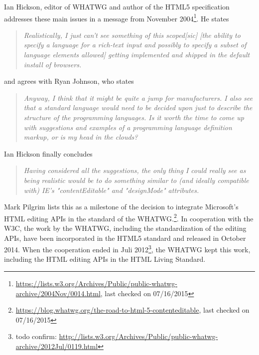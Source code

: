 
Ian Hickson, editor of WHATWG and author of the HTML5 specification addresses these main issues in a message from November 2004\footnote{\url{https://lists.w3.org/Archives/Public/public-whatwg-archive/2004Nov/0014.html}, last checked on 07/16/2015}. He states

\begin{quotation}
\textit{Realistically, I just can't see something of this scoped[sic] [the ability to specify a language for a rich-text input and possibly to specify a subset of language elements allowed] getting implemented and shipped in the default install of browsers.}
\end{quotation}

and agrees with Ryan Johnson, who states

\begin{quotation}
\textit{Anyway, I think that it might be quite a jump for manufacturers. I also see that a standard language would need to be decided upon just to describe the structure of the programming languages. Is it worth the time to come up with suggestions and examples of a programming language definition markup, or is my head in the clouds?}
\end{quotation}

Ian Hickson finally concludes

\begin{quotation}
\textit{Having considered all the suggestions, the only thing I could really see 
as being realistic would be to do something similar to (and ideally 
compatible with) IE's "contentEditable" and "designMode" attributes.}
\end{quotation}

Mark Pilgrim lists this as a milestone of the decision to integrate Microsoft's HTML editing APIs in the standard of the WHATWG.\footnote{\url{https://blog.whatwg.org/the-road-to-html-5-contenteditable}, last checked on 07/16/2015}. In cooperation with the W3C, the work by the WHATWG, including the standardization of the editing APIs, have been incorporated in the HTML5 standard and released in October 2014. When the cooperation ended in Juli 2012\footnote{todo confirm: \url{http://lists.w3.org/Archives/Public/public-whatwg-archive/2012Jul/0119.html}}, the WHATWG kept this work, including the HTML editing APIs in the HTML Living Standard.




